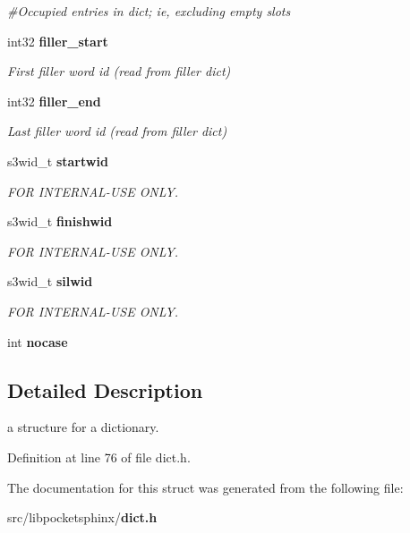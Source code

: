 \begin{DoxyCompactItemize}
\begin{DoxyCompactList}\small\item\em \#\+Occupied entries in dict; ie, excluding empty slots \end{DoxyCompactList}\item 
int32 {\bf filler\+\_\+start}\label{structdict__t_abd48fdafaaa68a8df2fd82163c51a95c}

\begin{DoxyCompactList}\small\item\em First filler word id (read from filler dict) \end{DoxyCompactList}\item 
int32 {\bf filler\+\_\+end}\label{structdict__t_a77c6692e56308968804add1292275cb7}

\begin{DoxyCompactList}\small\item\em Last filler word id (read from filler dict) \end{DoxyCompactList}\item 
s3wid\+\_\+t {\bf startwid}\label{structdict__t_a22bc6c52ce9e04c4f3f7d0ba1972ee51}

\begin{DoxyCompactList}\small\item\em F\+O\+R I\+N\+T\+E\+R\+N\+A\+L-\/\+U\+S\+E O\+N\+L\+Y. \end{DoxyCompactList}\item 
s3wid\+\_\+t {\bf finishwid}\label{structdict__t_a3875be5336e2d9888f6d5cb83ded82c5}

\begin{DoxyCompactList}\small\item\em F\+O\+R I\+N\+T\+E\+R\+N\+A\+L-\/\+U\+S\+E O\+N\+L\+Y. \end{DoxyCompactList}\item 
s3wid\+\_\+t {\bf silwid}\label{structdict__t_aad07b22b94c360923f151c02890f6e68}

\begin{DoxyCompactList}\small\item\em F\+O\+R I\+N\+T\+E\+R\+N\+A\+L-\/\+U\+S\+E O\+N\+L\+Y. \end{DoxyCompactList}\item 
int {\bfseries nocase}\label{structdict__t_a2240400afe39fbee593ff7e33f97008c}

\end{DoxyCompactItemize}


\subsection{Detailed Description}
a structure for a dictionary. 

Definition at line 76 of file dict.\+h.



The documentation for this struct was generated from the following file\+:\begin{DoxyCompactItemize}
\item 
src/libpocketsphinx/{\bf dict.\+h}\end{DoxyCompactItemize}
